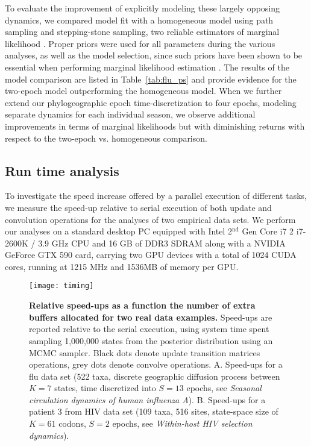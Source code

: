 To evaluate the improvement of explicitly modeling these largely opposing dynamics, we compared model fit with a homogeneous model using path sampling and stepping-stone sampling, two reliable estimators of marginal likelihood \citep{Baele2012}. 
Proper priors were used for all parameters during the various analyses, as well as the model selection, since such priors have been shown to be essential when performing marginal likelihood estimation \citep{Baele2012}.
The results of the model comparison are listed in Table~\ref{tab:flu_ps} and provide evidence for the two-epoch model outperforming the homogeneous model.
When we further extend our phylogeographic epoch time-discretization to four epochs, modeling separate dynamics for each individual season, we observe additional improvements in terms of marginal likelihoods but with diminishing returns with respect to the two-epoch vs. homogeneous comparison. %

\subsection{Run time analysis}

To investigate the speed increase offered by a parallel execution of different tasks, we measure the speed-up relative to serial execution of both update and convolution operations for the analyses of two empirical data sets.
We perform our analyses on a standard desktop PC equipped with Intel 2$^{\text{nd}}$ Gen Core i7 2 i7-2600K / 3.9 GHz CPU and 16 GB of DDR3 SDRAM along with a NVIDIA GeForce GTX 590 card, carrying two GPU devices with a total of 1024 CUDA cores, running at 1215 MHz and 1536MB of memory per GPU. 

\begin{figure}[h!]
\centering
\texttt{[image: timing]} 
\caption{
{\footnotesize 
{\bf Relative speed-ups as a function the number of extra buffers allocated for two real data examples.}
Speed-ups are reported relative to the serial execution, using system time spent sampling 1,000,000 states from the posterior distribution using an MCMC sampler. 
Black dots denote update transition matrices operations, grey dots denote convolve operations.
A. Speed-ups for a flu data set (522 taxa, discrete geographic diffusion process between $K=7$ states, time discretized into $S=13$ epochs, see {\it{Seasonal circulation dynamics of human influenza A}}). 
B. Speed-ups for a patient 3 from HIV data set (109 taxa, 516 sites, state-space size of $K=61$ codons, $S=2$ epochs, see {\it{Within-host HIV selection dynamics}}). 
} %
}
\label{fig:StackSizeTiming}
\end{figure}

